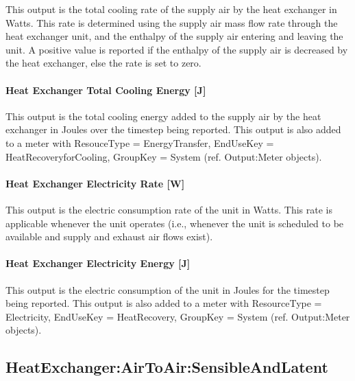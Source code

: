 This output is the total cooling rate of the supply air by the heat exchanger in Watts. This rate is determined using the supply air mass flow rate through the heat exchanger unit, and the enthalpy of the supply air entering and leaving the unit. A positive value is reported if the enthalpy of the supply air is decreased by the heat exchanger, else the rate is set to zero.

\paragraph{Heat Exchanger Total Cooling Energy {[}J{]}}\label{heat-exchanger-total-cooling-energy-j}

This output is the total cooling energy added to the supply air by the heat exchanger in Joules over the timestep being reported. This output is also added to a meter with ResouceType = EnergyTransfer, EndUseKey = HeatRecoveryforCooling, GroupKey = System (ref. Output:Meter objects).

\paragraph{Heat Exchanger Electricity Rate {[}W{]}}\label{heat-exchanger-electric-power-w}

This output is the electric consumption rate of the unit in Watts. This rate is applicable whenever the unit operates (i.e., whenever the unit is scheduled to be available and supply and exhaust air flows exist).

\paragraph{Heat Exchanger Electricity Energy {[}J{]}}\label{heat-exchanger-electric-energy-j}

This output is the electric consumption of the unit in Joules for the timestep being reported. This output is also added to a meter with ResourceType = Electricity, EndUseKey = HeatRecovery, GroupKey = System (ref. Output:Meter objects).

\subsection{HeatExchanger:AirToAir:SensibleAndLatent}\label{heatexchangerairtoairsensibleandlatent}

